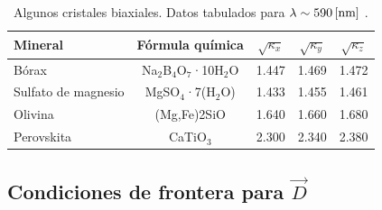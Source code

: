 \begin{table}[!h]
\begin{center}
\begin{tabular}{l c |c|c|c}
Mineral			& Fórmula química		& $\sqrt{\kappa_x}$	&	$\sqrt{\kappa_y}$	&  $\sqrt{\kappa_z}$	\\
\hline\hline
Bórax 	 		&Na$_2$B$_4$O$_7$·10H$_2$O& 	1.447	& 	1.469	& 	1.472	\\
Sulfato de magnesio		&  MgSO$_4$·7(H$_2$O)	& 	1.433	& 	1.455	& 	1.461	\\
Olivina			& 	(Mg,Fe)2SiO	& 	1.640	& 	1.660	& 	1.680	\\
Perovskita		& 	CaTiO$_3$	& 	2.300	& 	2.340	& 	2.380	%
\end{tabular}
\caption{Algunos cristales biaxiales. Datos tabulados para $\lambda\sim 590\,{\rm [nm]}$ \cite{hyper}.}
\end{center}
\end{table}
\subsection{Condiciones de frontera para $\vec{D}$}

